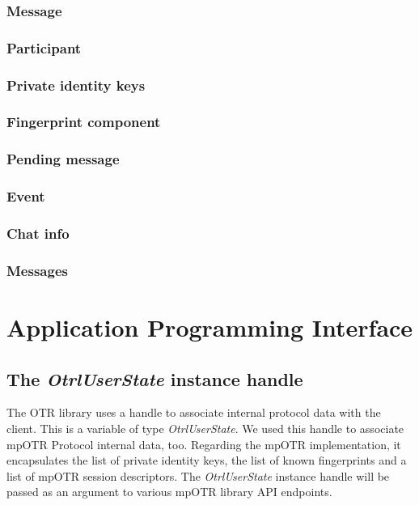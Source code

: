 \subsubsection{Message}

\subsubsection{Participant}

\subsubsection{Private identity keys}

\subsubsection{Fingerprint component}

\subsubsection{Pending message}

\subsubsection{Event}

\subsubsection{Chat info}

\subsubsection{Messages}

\section{Application Programming Interface}

\subsection{The \emph{OtrlUserState} instance handle}
The OTR library uses a handle to associate internal protocol data with the client. This is a variable of type \emph{OtrlUserState}. We used this handle to associate mpOTR Protocol internal data, too. Regarding the mpOTR implementation, it encapsulates the list of private identity keys, the list of known fingerprints and a list of mpOTR session descriptors. The \emph{OtrlUserState} instance handle will be passed as an argument to various mpOTR library API endpoints.

